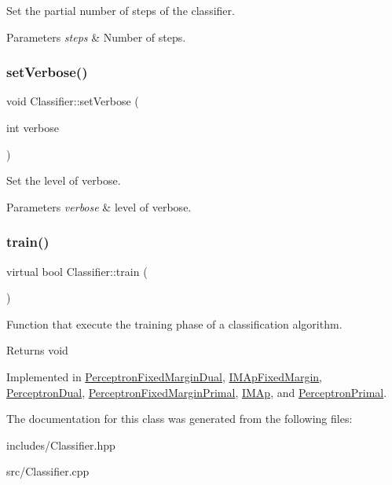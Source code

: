 Set the partial number of steps of the classifier. 


\begin{DoxyParams}{Parameters}
{\em steps} & Number of steps. \\
\hline
\end{DoxyParams}
\mbox{\label{class_classifier_a073b94029512378ccfae3aa34aae0212}} 
\subsubsection{\texorpdfstring{set\+Verbose()}{setVerbose()}}
{\footnotesize\ttfamily void Classifier\+::set\+Verbose (\begin{DoxyParamCaption}\item[{int}]{verbose }\end{DoxyParamCaption})}



Set the level of verbose. 


\begin{DoxyParams}{Parameters}
{\em verbose} & level of verbose. \\
\hline
\end{DoxyParams}
\mbox{\label{class_classifier_a2306a5de27555ab093593ac9642bc7d9}} 
\subsubsection{\texorpdfstring{train()}{train()}}
{\footnotesize\ttfamily virtual bool Classifier\+::train (\begin{DoxyParamCaption}{ }\end{DoxyParamCaption})\hspace{0.3cm}{\ttfamily [pure virtual]}}



Function that execute the training phase of a classification algorithm. 

\begin{DoxyReturn}{Returns}
void 
\end{DoxyReturn}


Implemented in \hyperlink{class_perceptron_fixed_margin_dual_aa095c90a3d04f70e1cf2e38e2afa769b}{Perceptron\+Fixed\+Margin\+Dual}, \hyperlink{class_i_m_ap_fixed_margin_ac43bc5733e6e749309277d3d99a86c11}{I\+M\+Ap\+Fixed\+Margin}, \hyperlink{class_perceptron_dual_a91b0bd1e86a6003b57b96199266cdc3e}{Perceptron\+Dual}, \hyperlink{class_perceptron_fixed_margin_primal_ad41c2a42c4a819c03bf9879110b0f99f}{Perceptron\+Fixed\+Margin\+Primal}, \hyperlink{class_i_m_ap_a6b6446fa6019518ae0336cb28af0b7f8}{I\+M\+Ap}, and \hyperlink{class_perceptron_primal_a17f817a72fc7d61d1686ea77f7f9e84d}{Perceptron\+Primal}.



The documentation for this class was generated from the following files\+:\begin{DoxyCompactItemize}
\item 
includes/Classifier.\+hpp\item 
src/Classifier.\+cpp\end{DoxyCompactItemize}
